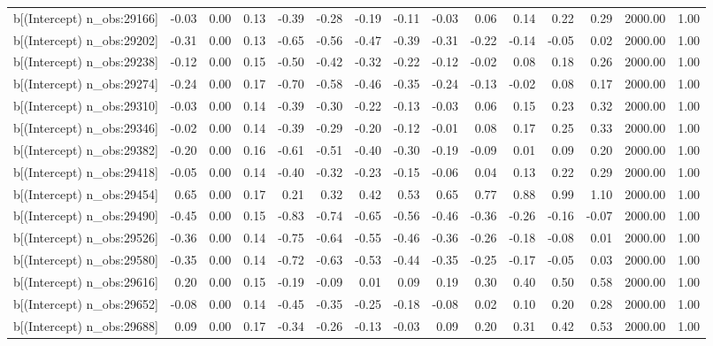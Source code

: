 \begin{table}[ht]
\begin{tabular}{rrrrrrrrrrrrrrr}
  b[(Intercept) n\_obs:29166] & -0.03 & 0.00 & 0.13 & -0.39 & -0.28 & -0.19 & -0.11 & -0.03 & 0.06 & 0.14 & 0.22 & 0.29 & 2000.00 & 1.00 \\ 
  b[(Intercept) n\_obs:29202] & -0.31 & 0.00 & 0.13 & -0.65 & -0.56 & -0.47 & -0.39 & -0.31 & -0.22 & -0.14 & -0.05 & 0.02 & 2000.00 & 1.00 \\ 
  b[(Intercept) n\_obs:29238] & -0.12 & 0.00 & 0.15 & -0.50 & -0.42 & -0.32 & -0.22 & -0.12 & -0.02 & 0.08 & 0.18 & 0.26 & 2000.00 & 1.00 \\ 
  b[(Intercept) n\_obs:29274] & -0.24 & 0.00 & 0.17 & -0.70 & -0.58 & -0.46 & -0.35 & -0.24 & -0.13 & -0.02 & 0.08 & 0.17 & 2000.00 & 1.00 \\ 
  b[(Intercept) n\_obs:29310] & -0.03 & 0.00 & 0.14 & -0.39 & -0.30 & -0.22 & -0.13 & -0.03 & 0.06 & 0.15 & 0.23 & 0.32 & 2000.00 & 1.00 \\ 
  b[(Intercept) n\_obs:29346] & -0.02 & 0.00 & 0.14 & -0.39 & -0.29 & -0.20 & -0.12 & -0.01 & 0.08 & 0.17 & 0.25 & 0.33 & 2000.00 & 1.00 \\ 
  b[(Intercept) n\_obs:29382] & -0.20 & 0.00 & 0.16 & -0.61 & -0.51 & -0.40 & -0.30 & -0.19 & -0.09 & 0.01 & 0.09 & 0.20 & 2000.00 & 1.00 \\ 
  b[(Intercept) n\_obs:29418] & -0.05 & 0.00 & 0.14 & -0.40 & -0.32 & -0.23 & -0.15 & -0.06 & 0.04 & 0.13 & 0.22 & 0.29 & 2000.00 & 1.00 \\ 
  b[(Intercept) n\_obs:29454] & 0.65 & 0.00 & 0.17 & 0.21 & 0.32 & 0.42 & 0.53 & 0.65 & 0.77 & 0.88 & 0.99 & 1.10 & 2000.00 & 1.00 \\ 
  b[(Intercept) n\_obs:29490] & -0.45 & 0.00 & 0.15 & -0.83 & -0.74 & -0.65 & -0.56 & -0.46 & -0.36 & -0.26 & -0.16 & -0.07 & 2000.00 & 1.00 \\ 
  b[(Intercept) n\_obs:29526] & -0.36 & 0.00 & 0.14 & -0.75 & -0.64 & -0.55 & -0.46 & -0.36 & -0.26 & -0.18 & -0.08 & 0.01 & 2000.00 & 1.00 \\ 
  b[(Intercept) n\_obs:29580] & -0.35 & 0.00 & 0.14 & -0.72 & -0.63 & -0.53 & -0.44 & -0.35 & -0.25 & -0.17 & -0.05 & 0.03 & 2000.00 & 1.00 \\ 
  b[(Intercept) n\_obs:29616] & 0.20 & 0.00 & 0.15 & -0.19 & -0.09 & 0.01 & 0.09 & 0.19 & 0.30 & 0.40 & 0.50 & 0.58 & 2000.00 & 1.00 \\ 
  b[(Intercept) n\_obs:29652] & -0.08 & 0.00 & 0.14 & -0.45 & -0.35 & -0.25 & -0.18 & -0.08 & 0.02 & 0.10 & 0.20 & 0.28 & 2000.00 & 1.00 \\ 
  b[(Intercept) n\_obs:29688] & 0.09 & 0.00 & 0.17 & -0.34 & -0.26 & -0.13 & -0.03 & 0.09 & 0.20 & 0.31 & 0.42 & 0.53 & 2000.00 & 1.00 \\ 

\end{tabular}
\end{table}
